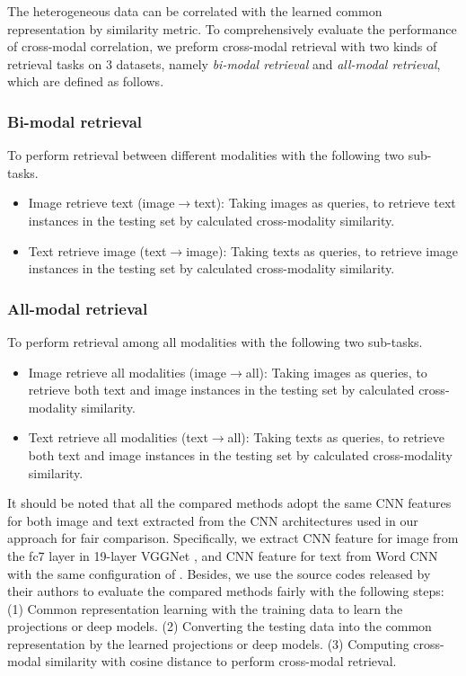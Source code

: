 \documentclass[journal]{IEEEtran}
\begin{document}
The heterogeneous data can be correlated with the learned common representation by similarity metric. To comprehensively evaluate the performance of cross-modal correlation, we preform cross-modal retrieval with two kinds of retrieval tasks on 3 datasets, namely \textit{bi-modal retrieval} and \textit{all-modal retrieval}, which are defined as follows.

\subsubsection{\textbf{Bi-modal retrieval}} To perform retrieval between different modalities with the following two sub-tasks.

\begin{itemize}
	\item {Image retrieve text} (image$\to$text): Taking images as queries, to retrieve text instances in the testing set by calculated cross-modality similarity.
	\item {Text retrieve image} (text$\to$image): Taking texts as queries, to retrieve image instances in the testing set by calculated cross-modality similarity.
\end{itemize}

\subsubsection{\textbf{All-modal retrieval}} To perform retrieval among all modalities with the following two sub-tasks.

\begin{itemize}
	\item {Image retrieve all modalities} (image$\to$all): Taking images as queries, to retrieve both text and image instances in the testing set by calculated cross-modality similarity.
	\item {Text retrieve all modalities} (text$\to$all): Taking texts as queries, to retrieve both text and image instances in the testing set by calculated cross-modality similarity.
\end{itemize}

It should be noted that all the compared methods adopt the same CNN features for both image and text extracted from the CNN architectures used in our approach for fair comparison. Specifically, we extract CNN feature for image from the fc7 layer in 19-layer VGGNet \cite{DBLP:journals/corr/SimonyanZ14a}, and CNN feature for text from Word CNN with the same configuration of \cite{DBLP:conf/emnlp/Kim14}. Besides, we use the source codes released by their authors to evaluate the compared methods fairly with the following steps: (1) Common representation learning with the training data to learn the projections or deep models. (2) Converting the testing data into the common representation by the learned projections or deep models. (3) Computing cross-modal similarity with cosine distance to perform cross-modal retrieval.
\end{document}
